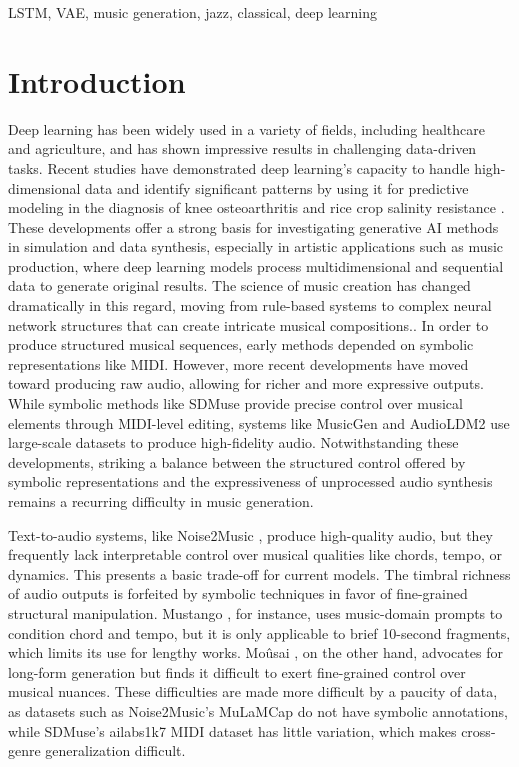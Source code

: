 \documentclass[conference]{IEEEtran}
\begin{document}
\begin{IEEEkeywords}
LSTM, VAE, music generation, jazz, classical, deep learning
\end{IEEEkeywords}

\section{Introduction}
Deep learning has been widely used in a variety of fields, including healthcare and agriculture, and has shown impressive results in challenging data-driven tasks.  Recent studies have demonstrated deep learning's capacity to handle high-dimensional data and identify significant patterns by using it for predictive modeling in the diagnosis of knee osteoarthritis and rice crop salinity resistance \cite{fc1, fc2, fc3, fc4}.  These developments offer a strong basis for investigating generative AI methods in simulation and data synthesis, especially in artistic applications such as music production, where deep learning models process multidimensional and sequential data to generate original results.  The science of music creation has changed dramatically in this regard, moving from rule-based systems to complex neural network structures that can create intricate musical compositions.\cite{mariani2024multisourcediffusionmodelssimultaneous, huang2024symbolicmusicgenerationnondifferentiable}.  In order to produce structured musical sequences, early methods depended on symbolic representations like MIDI. However, more recent developments have moved toward producing raw audio, allowing for richer and more expressive outputs.  While symbolic methods like SDMuse \cite{zhang2022sdmusestochasticdifferentialmusic} provide precise control over musical elements through MIDI-level editing, systems like MusicGen \cite{copet2024simplecontrollablemusicgeneration} and AudioLDM2 \cite{liu2024audioldm2learningholistic} use large-scale datasets to produce high-fidelity audio.  Notwithstanding these developments, striking a balance between the structured control offered by symbolic representations and the expressiveness of unprocessed audio synthesis remains a recurring difficulty in music generation.

Text-to-audio systems, like Noise2Music \cite{huang2023noise2musictextconditionedmusicgeneration}, produce high-quality audio, but they frequently lack interpretable control over musical qualities like chords, tempo, or dynamics. This presents a basic trade-off for current models.  The timbral richness of audio outputs is forfeited by symbolic techniques in favor of fine-grained structural manipulation.  Mustango \cite{melechovsky2024mustangocontrollabletexttomusicgeneration}, for instance, uses music-domain prompts to condition chord and tempo, but it is only applicable to brief 10-second fragments, which limits its use for lengthy works.  Moûsai \cite{schneider2023mousaitexttomusicgenerationlongcontext}, on the other hand, advocates for long-form generation but finds it difficult to exert fine-grained control over musical nuances.  These difficulties are made more difficult by a paucity of data, as datasets such as Noise2Music's MuLaMCap do not have symbolic annotations, while SDMuse's ailabs1k7 MIDI dataset has little variation, which makes cross-genre generalization difficult.
\end{document}
